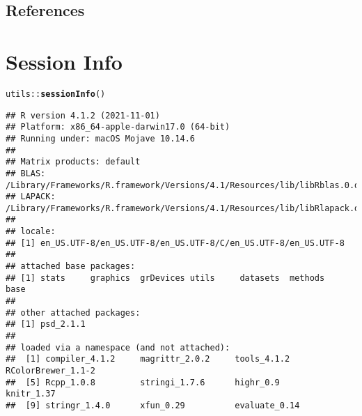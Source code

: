 \documentclass[11pt]{article}\usepackage[]{graphicx}\usepackage[]{color}
\makeatletter
\newcommand{\hlopt}[1]{\textcolor[rgb]{0,0,0}{#1}}%
\newcommand{\hlstd}[1]{\textcolor[rgb]{0.345,0.345,0.345}{#1}}%
\newcommand{\hlkwd}[1]{\textcolor[rgb]{0.737,0.353,0.396}{\textbf{#1}}}%
\newenvironment{kframe}{%
 \def\at@end@of@kframe{}%
 \ifinner\ifhmode%
  \def\at@end@of@kframe{\end{minipage}}%
  \begin{minipage}{\columnwidth}%
 \fi\fi%
 \def\FrameCommand##1{\hskip\@totalleftmargin \hskip-\fboxsep
 \colorbox{shadecolor}{##1}\hskip-\fboxsep
     \hskip-\linewidth \hskip-\@totalleftmargin \hskip\columnwidth}%
 \MakeFramed {\advance\hsize-\width
   \@totalleftmargin\z@ \linewidth\hsize
   \@setminipage}}%
 {\par\unskip\endMakeFramed%
 \at@end@of@kframe}
\newenvironment{knitrout}{}{} %
\makeatother
\begin{document}

\subsection{References}


\section*{Session Info}
\begin{knitrout}
\color{fgcolor}\begin{kframe}
\begin{alltt}
\hlstd{utils}\hlopt{::}\hlkwd{sessionInfo}\hlstd{()}
\end{alltt}
\begin{verbatim}
## R version 4.1.2 (2021-11-01)
## Platform: x86_64-apple-darwin17.0 (64-bit)
## Running under: macOS Mojave 10.14.6
## 
## Matrix products: default
## BLAS:   /Library/Frameworks/R.framework/Versions/4.1/Resources/lib/libRblas.0.dylib
## LAPACK: /Library/Frameworks/R.framework/Versions/4.1/Resources/lib/libRlapack.dylib
## 
## locale:
## [1] en_US.UTF-8/en_US.UTF-8/en_US.UTF-8/C/en_US.UTF-8/en_US.UTF-8
## 
## attached base packages:
## [1] stats     graphics  grDevices utils     datasets  methods   base     
## 
## other attached packages:
## [1] psd_2.1.1
## 
## loaded via a namespace (and not attached):
##  [1] compiler_4.1.2     magrittr_2.0.2     tools_4.1.2        RColorBrewer_1.1-2
##  [5] Rcpp_1.0.8         stringi_1.7.6      highr_0.9          knitr_1.37        
##  [9] stringr_1.4.0      xfun_0.29          evaluate_0.14
\end{verbatim}
\end{kframe}
\end{knitrout}



\end{document}
